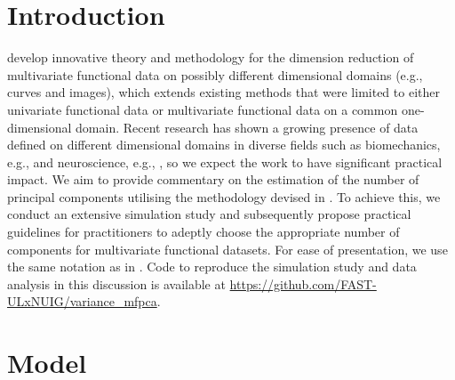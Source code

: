 
\section{Introduction} %
\label{sec:introduction}

\cite{happMultivariateFunctionalPrincipal2018} develop innovative theory and methodology for the dimension reduction of multivariate functional data on possibly different dimensional domains (e.g., curves and images), which extends existing methods that were limited to either univariate functional data or multivariate functional data on a common one-dimensional domain. Recent research has shown a growing presence of data defined on different dimensional domains in diverse fields such as biomechanics, e.g., \cite{warmenhovenBivariateFunctionalPrincipal2019} and neuroscience, e.g., \cite{songSparseMultivariateFunctional2022}, so we expect the work to have significant practical impact. We aim to provide commentary on the estimation of the number of principal components utilising the methodology devised in \cite{happMultivariateFunctionalPrincipal2018}. To achieve this, we conduct an extensive simulation study and subsequently propose practical guidelines for practitioners to adeptly choose the appropriate number of components for multivariate functional datasets. For ease of presentation, we use the same notation as in \cite{happMultivariateFunctionalPrincipal2018}. Code to reproduce the simulation study and data analysis in this discussion is available at \url{https://github.com/FAST-ULxNUIG/variance_mfpca}.


\section{Model} %
\label{sec:model}

